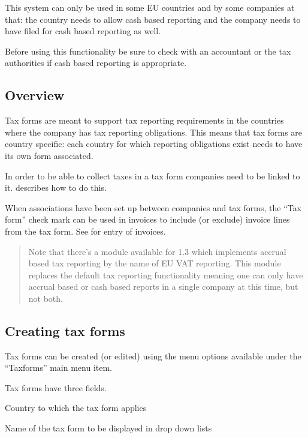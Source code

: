 This system can only be used in some EU countries and by some companies at that: the
country needs to allow cash based reporting and the company needs to have filed
for cash based reporting as well.

Before using this functionality be sure to check with an accountant or the tax
authorities if cash based reporting is appropriate.

\subsection{Overview}
\label{subsec-tax-taxforms-overview}

Tax forms are meant to support tax reporting requirements in the countries
where the company has tax reporting obligations. This means that tax forms
are country specific: each country for which reporting obligations exist
needs to have its own form associated.

In order to be able to collect taxes in a tax form companies need to be
linked to it.  describes how to do this.

When associations have been set up between companies and
tax forms, the ``Tax form'' check mark can be used in invoices to include
(or exclude) invoice lines from the tax form. See 
for entry of invoices.

\begin{quote}
Note that there's a module available for 1.3 which implements accrual based tax reporting by
the name of EU VAT reporting. This module replaces the default tax reporting functionality
meaning one can only have accrual based or cash based reports in a single company at this time,
but not both.
\end{quote}

\subsection{Creating tax forms}
\label{subsec-tax-taxforms-creation}

Tax forms can be created (or edited) using the menu options available under the
``Taxforms'' main menu item.

Tax forms have three fields.

\begin{description}[style=nextline]
\item [Country] Country to which the tax form applies
\item [Description] Name of the tax form to be displayed in drop down lists
\item [Select by Default] %
\end{description}



